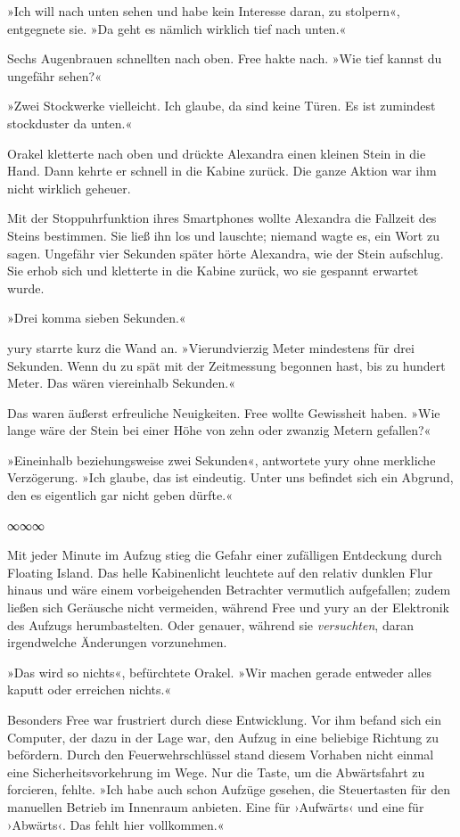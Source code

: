 »Ich will nach unten sehen und habe kein Interesse daran, zu stolpern«, entgegnete sie. »Da geht es nämlich wirklich tief nach unten.«

Sechs Augenbrauen schnellten nach oben. Free hakte nach. »Wie tief kannst du ungefähr sehen?«

»Zwei Stockwerke vielleicht. Ich glaube, da sind keine Türen. Es ist zumindest stockduster da unten.«

Orakel kletterte nach oben und drückte Alexandra einen kleinen Stein in die Hand. Dann kehrte er schnell in die Kabine zurück. Die ganze Aktion war ihm nicht wirklich geheuer.

Mit der Stoppuhrfunktion ihres Smartphones wollte Alexandra die Fallzeit des Steins bestimmen. Sie ließ ihn los und lauschte; niemand wagte es, ein Wort zu sagen. Ungefähr vier Sekunden später hörte Alexandra, wie der Stein aufschlug. Sie erhob sich und kletterte in die Kabine zurück, wo sie gespannt erwartet wurde.

»Drei komma sieben Sekunden.«

yury starrte kurz die Wand an. »Vierundvierzig Meter mindestens für drei Sekunden. Wenn du zu spät mit der Zeitmessung begonnen hast, bis zu hundert Meter. Das wären viereinhalb Sekunden.«

Das waren äußerst erfreuliche Neuigkeiten. Free wollte Gewissheit haben. »Wie lange wäre der Stein bei einer Höhe von zehn oder zwanzig Metern gefallen?«

»Eineinhalb beziehungsweise zwei Sekunden«, antwortete yury ohne merkliche Verzögerung. »Ich glaube, das ist eindeutig. Unter uns befindet sich ein Abgrund, den es eigentlich gar nicht geben dürfte.«

\begin{center}
	∞∞∞
\end{center}

Mit jeder Minute im Aufzug stieg die Gefahr einer zufälligen Entdeckung durch Floating Island. Das helle Kabinenlicht leuchtete auf den relativ dunklen Flur hinaus und wäre einem vorbeigehenden Betrachter vermutlich aufgefallen; zudem ließen sich Geräusche nicht vermeiden, während Free und yury an der Elektronik des Aufzugs herumbastelten. Oder genauer, während sie \emph{versuchten}, daran irgendwelche Änderungen vorzunehmen.

»Das wird so nichts«, befürchtete Orakel. »Wir machen gerade entweder alles kaputt oder erreichen nichts.«

Besonders Free war frustriert durch diese Entwicklung. Vor ihm befand sich ein Computer, der dazu in der Lage war, den Aufzug in eine beliebige Richtung zu befördern. Durch den Feuerwehrschlüssel stand diesem Vorhaben nicht einmal eine Sicherheitsvorkehrung im Wege. Nur die Taste, um die Abwärtsfahrt zu forcieren, fehlte. »Ich habe auch schon Aufzüge gesehen, die Steuertasten für den manuellen Betrieb im Innenraum anbieten. Eine für ›Aufwärts‹ und eine für ›Abwärts‹. Das fehlt hier vollkommen.«

